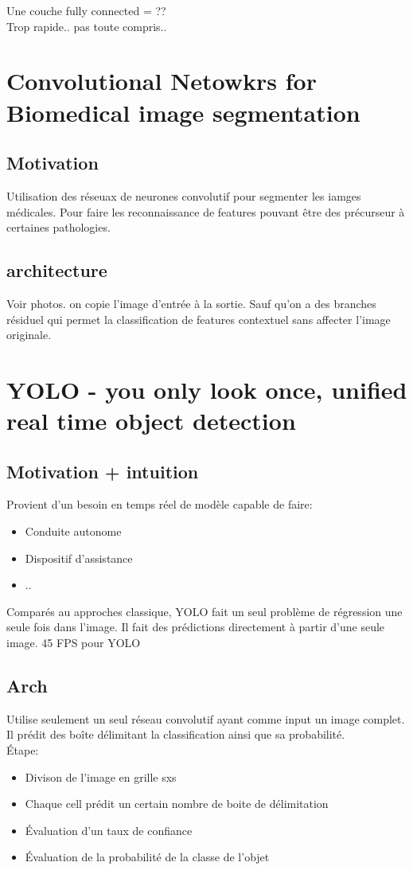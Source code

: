 \documentclass[oneside]{book}
\begin{document}
Une couche fully connected = ??\\

Trop rapide.. pas toute compris..

\section{Convolutional Netowkrs for Biomedical image segmentation}

\subsection{Motivation}
Utilisation des réseuax de neurones convolutif pour segmenter les iamges médicales. Pour faire les reconnaissance de features pouvant être des précurseur à certaines pathologies.\\

\subsection{architecture}
Voir photos. on copie l'image d'entrée à la sortie. Sauf qu'on a des branches résiduel qui permet la classification de features contextuel sans affecter l'image originale. 

\section{YOLO - you only look once, unified real time object detection}

\subsection{Motivation + intuition}
Provient d'un besoin en temps réel de modèle capable de faire:
\begin{itemize}
\item Conduite autonome
\item Dispositif d'assistance
\item ..
\end{itemize}

Comparés au approches classique, YOLO fait un seul problème de régression une seule fois dans l'image. Il fait des prédictions directement à partir d'une seule image. 45 FPS pour YOLO

\subsection{Arch}
Utilise seulement un seul réseau convolutif ayant comme input un image complet. Il prédit des boîte délimitant la classification ainsi que sa probabilité. \\
Étape:\\
 \begin{itemize}
 \item Divison de l'image en grille sxs
 \item Chaque cell prédit un certain nombre de boite de délimitation
 \item Évaluation d'un taux de confiance
 \item Évaluation de la probabilité de la classe de l'objet
 \end{itemize}
 
\end{document}
